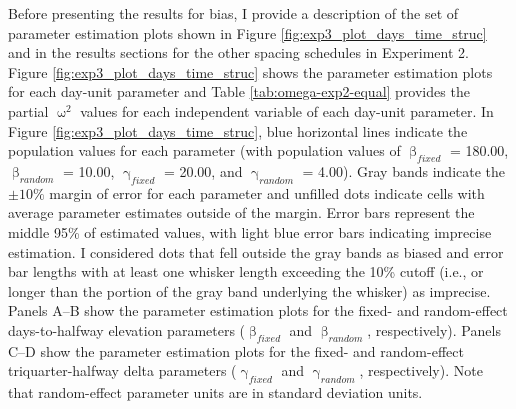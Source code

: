 \documentclass[
12pt, %
twoside,
english]{guelphthesis}
\begin{document}
Before presenting the results for bias, I provide a description of the set of parameter estimation plots shown in Figure \ref{fig:exp3_plot_days_time_struc} and in the results sections for the other spacing schedules in Experiment 2. Figure \ref{fig:exp3_plot_days_time_struc} shows the parameter estimation plots for each day-unit parameter and Table \ref{tab:omega-exp2-equal} provides the partial \(\upomega^2\) values for each independent variable of each day-unit parameter. In Figure \ref{fig:exp3_plot_days_time_struc}, blue horizontal lines indicate the population values for each parameter (with population values of \(\upbeta_{fixed}\) = 180.00, \(\upbeta_{random}\) = 10.00, \(\upgamma_{fixed}\) = 20.00, and \(\upgamma_{random}\) = 4.00). Gray bands indicate the \(\pm 10\%\) margin of error for each parameter and unfilled dots indicate cells with average parameter estimates outside of the margin. Error bars represent the middle 95\% of estimated values, with light blue error bars indicating imprecise estimation. I considered dots that fell outside the gray bands as biased and error bar lengths with at least one whisker length exceeding the 10\% cutoff (i.e., or longer than the portion of the gray band underlying the whisker) as imprecise. Panels A--B show the parameter estimation plots for the fixed- and random-effect days-to-halfway elevation parameters (\(\upbeta_{fixed}\) and \(\upbeta_{random}\), respectively). Panels C--D show the parameter estimation plots for the fixed- and random-effect triquarter-halfway delta parameters (\(\upgamma_{fixed}\) and \(\upgamma_{random}\), respectively). Note that random-effect parameter units are in standard deviation units.
\end{document}
